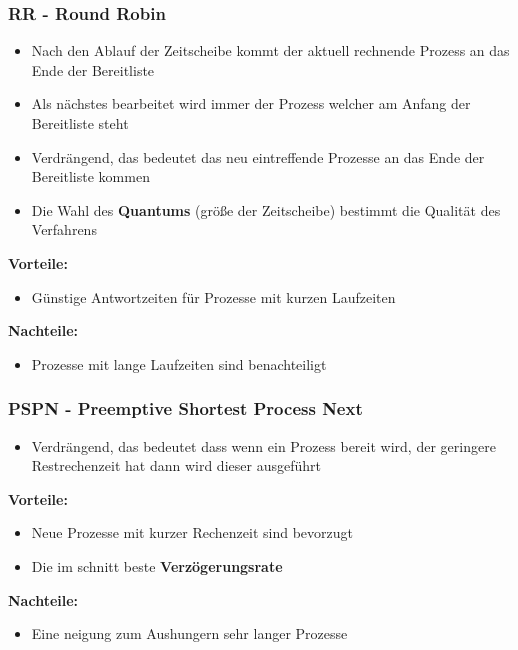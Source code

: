 \documentclass[10pt,a4paper]{article}
\begin{document}
\begin{multicols*}{4}
\subsubsection*{RR - Round Robin}
\begin{itemize}
	\item Nach den Ablauf der Zeitscheibe kommt der aktuell rechnende Prozess an das Ende der Bereitliste
	\item Als nächstes bearbeitet wird immer der Prozess welcher am Anfang der Bereitliste steht
	\item Verdrängend, das bedeutet das neu eintreffende Prozesse an das Ende der Bereitliste kommen
	\item Die Wahl des \textbf{Quantums} (größe der Zeitscheibe) bestimmt die Qualität des Verfahrens
\end{itemize}
\textbf{\small Vorteile:}\hfill
\begin{itemize}
	\item Günstige Antwortzeiten für Prozesse mit kurzen Laufzeiten
\end{itemize}
\textbf{\small Nachteile:}\hfill
\begin{itemize}
	\item Prozesse mit lange Laufzeiten sind benachteiligt
\end{itemize}
\subsubsection*{PSPN - Preemptive Shortest Process Next}
\begin{itemize}
	\item Verdrängend, das bedeutet dass wenn ein Prozess bereit wird, der geringere Restrechenzeit hat dann wird
	      dieser ausgeführt
\end{itemize}
\textbf{\small Vorteile:}\hfill
\begin{itemize}
	\item Neue Prozesse mit kurzer Rechenzeit sind bevorzugt
	\item Die im schnitt beste \textbf{Verzögerungsrate}
\end{itemize}
\textbf{\small Nachteile:}\hfill
\begin{itemize}
	\item Eine neigung zum Aushungern sehr langer Prozesse
\end{itemize}

\end{multicols*}
\end{document}
